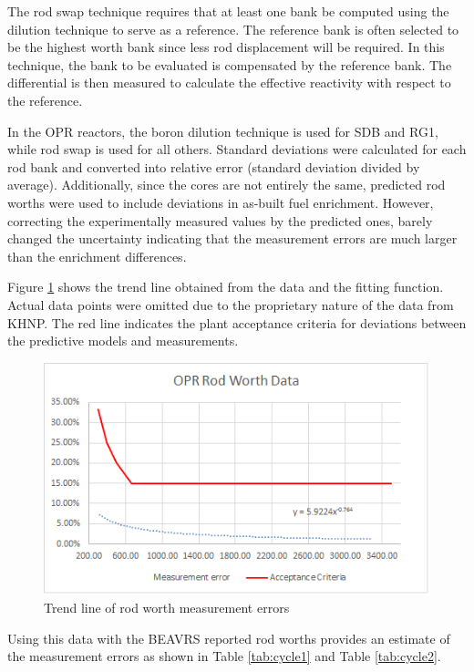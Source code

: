 \documentclass{article}
\begin{document}
The rod swap technique requires that at least one bank be computed using the dilution technique to serve as a reference.  The reference bank is often selected to be the highest worth bank since less rod displacement will be required.  In this technique, the bank to be evaluated is compensated by the reference bank.  The differential is then measured to calculate the effective reactivity with respect to the reference.

In the OPR reactors, the boron dilution technique is used for SDB and RG1, while rod swap is used for all others. Standard deviations were calculated for each rod bank and converted into relative error (standard deviation divided by average).  Additionally, since the cores are not entirely the same, predicted rod worths were used to include deviations in as-built fuel enrichment.  However, correcting the experimentally measured values by the predicted ones, barely changed the uncertainty indicating that the measurement errors are much larger than the enrichment differences.

Figure \ref{fig:fig_trend_line} shows the trend line obtained from the data and the fitting function.  Actual data points were omitted due to the proprietary nature of the data from KHNP.  The red line indicates the plant acceptance criteria for deviations between the predictive models and measurements.


\begin{figure}[ht]
   \centering
   \includegraphics[keepaspectratio, width = 4.0 in]{figures/rod_worth.png}
   \caption{Trend line of rod worth measurement errors}  
   \label{fig:fig_trend_line}
 \end{figure} 
 
Using this data with the BEAVRS reported rod worths provides an estimate of the measurement errors as shown in Table \ref{tab:cycle1} and Table \ref{tab:cycle2}.
\end{document}
